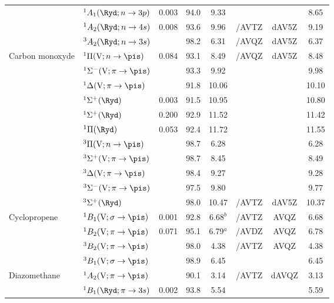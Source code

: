 \begin{tabular}{llcccccc}
        &$^1A_1 (\Ryd;n \rightarrow 3p)$ 						& 0.003	&94.0& 9.33		&			&			&8.65 	\\
        &$^1A_2 (\Ryd;n \rightarrow 4s)$ 						& 0.008	&93.6& 9.96		&{\exCI}/AVTZ  & dAV5Z		&9.19 	\\
        &$^3A_2 (\Ryd;n \rightarrow 3s)$ 						&		&98.2& 6.31		&{\exCI}/AVQZ & dAV5Z		&6.37	\\
  Carbon monoxyde	&$^1\Pi (\mathrm{V};n \rightarrow \pis)$ 				& 0.084	&93.1 & 8.49		& {\exCI}/AVQZ& dAV5Z		&8.48	\\
        &$^1\Sigma^- (\mathrm{V};\pi \rightarrow \pis)$				&		&93.3 & 9.92		&			&			&9.98 	\\
        &$^1\Delta (\mathrm{V};\pi \rightarrow \pis)$ 				&		&91.8 &10.06		&			&			&10.10 	\\
        &$^1\Sigma^+ (\Ryd)$ 								& 0.003	&91.5 &10.95		&			&			&10.80 	\\
        &$^1\Sigma^+ (\Ryd)$ 								& 0.200	&92.9 &11.52		&			&			&11.42 	\\
        &$^1\Pi (\Ryd)$										& 0.053	&92.4 &11.72		&			&			&11.55 	\\
        &$^3\Pi (\mathrm{V};n \rightarrow \pis)$ 					&		&98.7 & 6.28		&			&			&6.28 	\\
        &$^3\Sigma^+ (\mathrm{V};\pi \rightarrow \pis)$			&		&98.7 & 8.45		&			&			&8.49 	\\
        &$^3\Delta (\mathrm{V};\pi \rightarrow \pis)$ 				&		&98.4 & 9.27		&			&			&9.28 	\\
        &$^3\Sigma^- (\mathrm{V};\pi \rightarrow \pis)$				&		&97.5 & 9.80		&			&			&9.77	\\
        &$^3\Sigma^+ (\Ryd)$ 								&		&98.0 & 10.47		&  {\exCI}/AVTZ &dAV5Z		&10.37 	\\
  Cyclopropene	&$^1B_1 (\mathrm{V};\sigma \rightarrow \pis)$				& 0.001	&92.8 &6.68$^b$	& {\CCSDT}/AVTZ&AVQZ		& 6.68 	\\
        &$^1B_2 (\mathrm{V};\pi \rightarrow \pis)$				& 0.071	&95.1 &6.79$^a$	& {\exCI}/AVDZ	    &AVQZ		& 6.78 	\\
        &$^3B_2 (\mathrm{V};\pi \rightarrow \pis)$				&		&98.0 &4.38		& {\exCI}/AVTZ     &AVQZ 	& 4.38	 \\
        &$^3B_1 (\mathrm{V};\sigma \rightarrow \pis)$				& 		&98.9 &6.45		& 			    &			& 6.45 	\\
  Diazomethane	&$^1A_2 (\mathrm{V};\pi \rightarrow \pis)$ 				&		&90.1 &3.14		&{\exCI}/AVTZ & dAVQZ		&3.13 	\\
        &$^1B_1 (\Ryd;\pi \rightarrow 3s)$ 						& 0.002	&93.8 &5.54		&			&			&5.59 	\\

\end{tabular}
